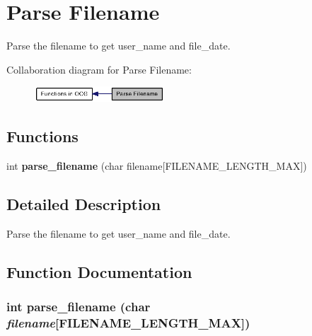 \section{Parse Filename}
\label{group____parse__filename}
Parse the filename to get user\_\-name and file\_\-date.  




Collaboration diagram for Parse Filename:\nopagebreak
\begin{figure}[H]
\begin{center}
\leavevmode
\includegraphics[width=137pt]{group____parse__filename}
\end{center}
\end{figure}
\subsection*{Functions}
\begin{CompactItemize}
\item 
int {\bf parse\_\-filename} (char filename[FILENAME\_\-LENGTH\_\-MAX])
\end{CompactItemize}


\subsection{Detailed Description}
Parse the filename to get user\_\-name and file\_\-date. 

\subsection{Function Documentation}
\subsubsection[{parse\_\-filename}]{\setlength{\rightskip}{0pt plus 5cm}int parse\_\-filename (char {\em filename}[FILENAME\_\-LENGTH\_\-MAX])}\label{group____parse__filename_g0ec64ec9034234705f9b0dfd5b5b5c42}


